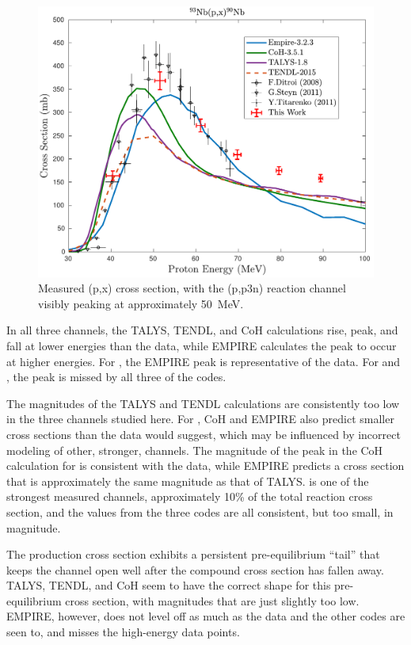 \begin{figure}
 \centering
 \includegraphics[width=0.5\linewidth]{./figures/90Nb.pdf}
 \caption{Measured (p,x) cross section, with the (p,p3n) reaction channel visibly peaking at approximately \mbox{50 MeV}.}
 \label{fig:90Nb}
\end{figure}




In all three channels, the TALYS, TENDL, and CoH calculations rise, peak, and fall at lower energies than the data, while EMPIRE calculates the peak to occur at higher energies.
For , the EMPIRE peak is representative of the data.
For  and , the peak is missed by all three  of the codes.


The magnitudes of the TALYS and TENDL calculations are consistently too low in the three channels studied here. 
For , CoH and EMPIRE also predict smaller cross sections than the data would suggest, which may be influenced by incorrect modeling of other, stronger, channels.
The magnitude of the peak in the CoH calculation for   is consistent  with the data, while EMPIRE predicts a cross section that is approximately the same magnitude as that of TALYS.
 is one of the strongest measured channels, approximately 10\% of the total reaction cross section, and the values from the three codes are all consistent, but  too small, in magnitude.

The  production cross section exhibits a persistent pre-equilibrium \enquote{tail} that keeps the channel open  well after the compound cross section has fallen away. 
TALYS, TENDL, and CoH seem to have the correct shape for this pre-equilibrium cross section, with magnitudes that are just slightly too low.
EMPIRE, however, does not level off  as much as the data and the other codes are seen to, and misses the high-energy data points.

